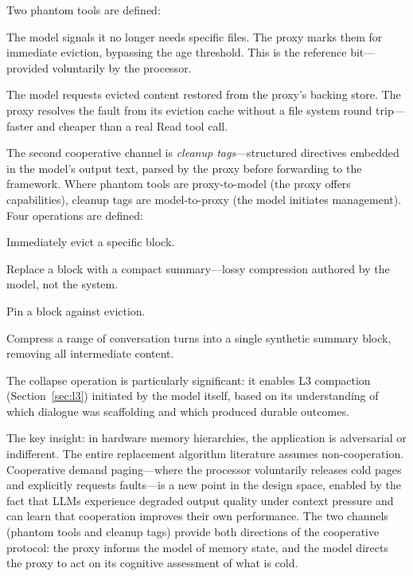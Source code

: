 Two phantom tools are defined:

\begin{description}[nosep]
  \item[\texttt{memory\_release(paths)}] The model signals it no
    longer needs specific files. The proxy marks them for immediate
    eviction, bypassing the age threshold. This is the reference
    bit---provided voluntarily by the processor.
  \item[\texttt{memory\_fault(paths)}] The model requests evicted
    content restored from the proxy's backing store. The proxy
    resolves the fault from its eviction cache without a file system
    round trip---faster and cheaper than a real Read tool call.
\end{description}

The second cooperative channel is \emph{cleanup tags}---structured
directives embedded in the model's output text, parsed by the proxy
before forwarding to the framework. Where phantom tools are
proxy-to-model (the proxy offers capabilities), cleanup tags are
model-to-proxy (the model initiates management). Four operations are
defined:

\begin{description}[nosep]
  \item[\texttt{drop: block:ID}] Immediately evict a specific block.
  \item[\texttt{summarize: block:ID "text"}] Replace a block with a
    compact summary---lossy compression authored by the model, not
    the system.
  \item[\texttt{anchor: block:ID}] Pin a block against eviction.
  \item[\texttt{collapse: turns N-M "text"}] Compress a range of
    conversation turns into a single synthetic summary block,
    removing all intermediate content.
\end{description}

The collapse operation is particularly significant: it enables L3
compaction (Section~\ref{sec:l3}) initiated by the model itself,
based on its understanding of which dialogue was scaffolding and
which produced durable outcomes.

The key insight: in hardware memory hierarchies, the application is
adversarial or indifferent. The entire replacement algorithm
literature assumes non-cooperation. Cooperative demand paging---where
the processor voluntarily releases cold pages and explicitly
requests faults---is a new point in the design space, enabled by the
fact that LLMs experience degraded output quality under context
pressure and can learn that cooperation improves their own
performance. The two channels (phantom tools and cleanup tags)
provide both directions of the cooperative protocol: the proxy
informs the model of memory state, and the model directs the proxy
to act on its cognitive assessment of what is cold.

